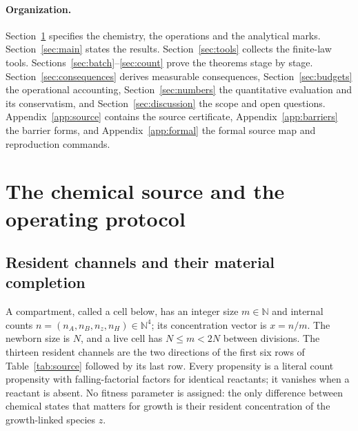\documentclass[11pt,a4paper]{article}
\theoremstyle{plain}
\theoremstyle{definition}
\theoremstyle{remark}
\newcommand{\N}{\mathbb N}
\newcommand{\Hs}{H}
\begin{document}
\paragraph{Organization.}
Section~\ref{sec:model} specifies the chemistry, the operations and the analytical marks. Section~\ref{sec:main} states the results. Section~\ref{sec:tools} collects the finite-law tools. Sections~\ref{sec:batch}--\ref{sec:count} prove the theorems stage by stage. Section~\ref{sec:consequences} derives measurable consequences, Section~\ref{sec:budgets} the operational accounting, Section~\ref{sec:numbers} the quantitative evaluation and its conservatism, and Section~\ref{sec:discussion} the scope and open questions. Appendix~\ref{app:source} contains the source certificate, Appendix~\ref{app:barriers} the barrier forms, and Appendix~\ref{app:formal} the formal source map and reproduction commands.

\section{The chemical source and the operating protocol}\label{sec:model}

\subsection{Resident channels and their material completion}\label{sec:chemistry}
A compartment, called a cell below, has an integer size $m\in\N$ and internal counts $n=(n_A,n_B,n_z,n_\Hs)\in\N^4$; its concentration vector is $x=n/m$. The newborn size is $N$, and a live cell has $N\le m<2N$ between divisions. The thirteen resident channels are the two directions of the first six rows of Table~\ref{tab:source} followed by its last row. Every propensity is a literal count propensity with falling-factorial factors for identical reactants; it vanishes when a reactant is absent. No fitness parameter is assigned: the only difference between chemical states that matters for growth is their resident concentration of the growth-linked species $z$.
\end{document}
